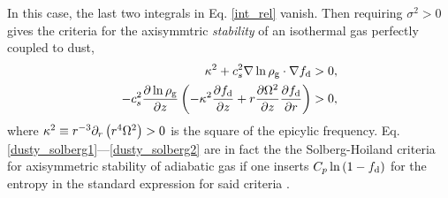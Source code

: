 In this case, the last two integrals in Eq. \ref{int_rel} vanish. Then 
requiring $\sigma^2>0$  gives the criteria 
for the axisymmtric \emph{stability} of an isothermal gas perfectly 
coupled to dust,  
\begin{align}
  \kappa^2 + c_s^2 \nabla\ln{\rho_\mathrm{g}}\cdot\nabla f_\mathrm{d} &> 0,\label{dusty_solberg1}  \\
  -c_s^2\frac{\partial\ln{\rho_\mathrm{g}}}{\partial z}\left(-\kappa^2\frac{\partial f_\mathrm{d}}{\partial
    z} + r\frac{\partial\Omega^2}{\partial z}\frac{\partial f_\mathrm{d}}{\partial r} \right) & > 0, \label{dusty_solberg2}
\end{align} 
where %
$\kappa^2 \equiv r^{-3}\partial_r\left(r^4\Omega^2\right)>0$ is the 
square of the epicylic frequency. %
Eq. \ref{dusty_solberg1}---\ref{dusty_solberg2} are in fact the 
the Solberg-Hoiland criteria for axisymmetric stability of adiabatic
gas if one inserts $C_p\ln{\left(1 -
    f_\mathrm{d}\right)}$ for the entropy in the standard
expression for said criteria \citep[e.g.][ where $C_p$ is the heat
  capacity]{tassoul78}.   



